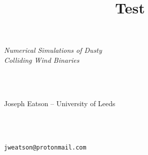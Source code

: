 \documentclass[portrait,a0]{a0poster}
\title{Test}
\begin{document}
    \begin{VERYHuge}
      \textsl{Numerical Simulations of Dusty\\Colliding Wind Binaries}
    \end{VERYHuge}
    \\\\
    \begin{VeryHuge}
      Joseph Eatson -- University of Leeds
    \end{VeryHuge}
    \\\\
    \begin{Large}
      \texttt{jweatson@protonmail.com}
    \end{Large}

    \vspace{1in}
    \Large
\end{document}
